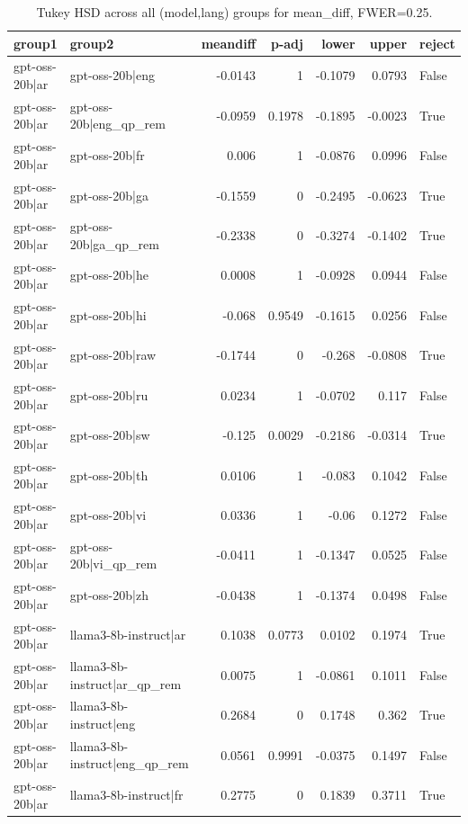 \begin{table}
\caption{Tukey HSD across all (model,lang) groups for mean_diff, FWER=0.25.}
\label{tab:tukey_all_models_all_langs_mean_diff}
\begin{tabular}{l l r r r r l}
\toprule
group1 & group2 & meandiff & p-adj & lower & upper & reject \\
\midrule
gpt-oss-20b|ar & gpt-oss-20b|eng & -0.0143 & 1 & -0.1079 & 0.0793 & False \\
gpt-oss-20b|ar & gpt-oss-20b|eng_qp_rem & -0.0959 & 0.1978 & -0.1895 & -0.0023 & True \\
gpt-oss-20b|ar & gpt-oss-20b|fr & 0.006 & 1 & -0.0876 & 0.0996 & False \\
gpt-oss-20b|ar & gpt-oss-20b|ga & -0.1559 & 0 & -0.2495 & -0.0623 & True \\
gpt-oss-20b|ar & gpt-oss-20b|ga_qp_rem & -0.2338 & 0 & -0.3274 & -0.1402 & True \\
gpt-oss-20b|ar & gpt-oss-20b|he & 0.0008 & 1 & -0.0928 & 0.0944 & False \\
gpt-oss-20b|ar & gpt-oss-20b|hi & -0.068 & 0.9549 & -0.1615 & 0.0256 & False \\
gpt-oss-20b|ar & gpt-oss-20b|raw & -0.1744 & 0 & -0.268 & -0.0808 & True \\
gpt-oss-20b|ar & gpt-oss-20b|ru & 0.0234 & 1 & -0.0702 & 0.117 & False \\
gpt-oss-20b|ar & gpt-oss-20b|sw & -0.125 & 0.0029 & -0.2186 & -0.0314 & True \\
gpt-oss-20b|ar & gpt-oss-20b|th & 0.0106 & 1 & -0.083 & 0.1042 & False \\
gpt-oss-20b|ar & gpt-oss-20b|vi & 0.0336 & 1 & -0.06 & 0.1272 & False \\
gpt-oss-20b|ar & gpt-oss-20b|vi_qp_rem & -0.0411 & 1 & -0.1347 & 0.0525 & False \\
gpt-oss-20b|ar & gpt-oss-20b|zh & -0.0438 & 1 & -0.1374 & 0.0498 & False \\
gpt-oss-20b|ar & llama3-8b-instruct|ar & 0.1038 & 0.0773 & 0.0102 & 0.1974 & True \\
gpt-oss-20b|ar & llama3-8b-instruct|ar_qp_rem & 0.0075 & 1 & -0.0861 & 0.1011 & False \\
gpt-oss-20b|ar & llama3-8b-instruct|eng & 0.2684 & 0 & 0.1748 & 0.362 & True \\
gpt-oss-20b|ar & llama3-8b-instruct|eng_qp_rem & 0.0561 & 0.9991 & -0.0375 & 0.1497 & False \\
gpt-oss-20b|ar & llama3-8b-instruct|fr & 0.2775 & 0 & 0.1839 & 0.3711 & True \\

\end{tabular}
\end{table}
